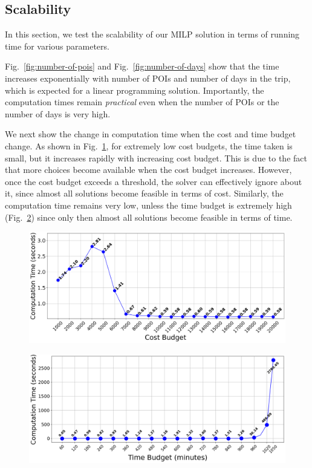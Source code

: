 \subsection{Scalability}

In this section, we test the scalability of our MILP solution in terms of running time for various parameters.

Fig.~\ref{fig:number-of-pois} and Fig.~\ref{fig:number-of-days} show that the time increases exponentially with number of POIs and number of days in the trip, which is expected for a linear programming solution.
Importantly, the computation times remain \emph{practical} even when the number of POIs or the number of days is very high.

We next show the change in computation time when the cost and time budget change.
As shown in Fig.~\ref{fig:cost-budget}, for extremely low cost budgets, the time taken is small, but it increases rapidly with increasing cost budget. This is due to the fact that more choices become available when the cost budget increases. However, once the cost budget exceeds a threshold, the solver can effectively ignore about it, since almost all solutions become feasible in terms of cost.
Similarly, the computation time remains very low, unless the time budget is extremely high (Fig.~\ref{fig:time-budget}) since only then almost all solutions become feasible in terms of time.

\begin{figure}[t]
    \centering
    \includegraphics[width=\figwidth]{plots/costbudgetvstoc.png}
    \label{fig:cost-budget}
\end{figure}

\begin{figure}[t]
    \centering
    \includegraphics[width=\figwidth]{plots/timebudgetvstoc.png}
    \label{fig:time-budget}
\end{figure}

